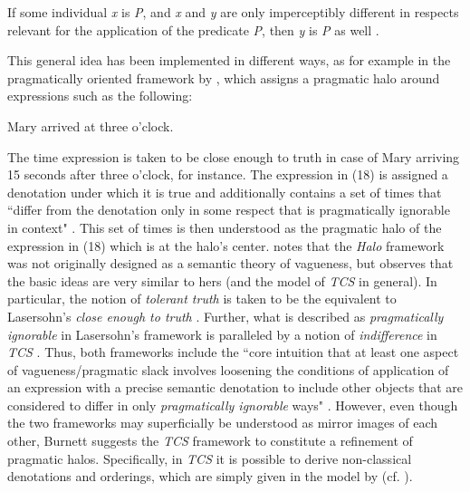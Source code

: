\documentclass[output=paper
,modfonts
,nonflat]{langsci/langscibook}
\begin{document}
\ea
	If some individual \textit{x} is \textit{P}, and \textit{x} and \textit{y} are only imperceptibly different in respects relevant for the application of the predicate \textit{P}, then \textit{y} is \textit{P} as well \textcite[348]{Cobreros2012}.
\z

This general idea has been implemented in different ways, as for example in the pragmatically oriented framework by \citet{Lasersohn1999}, which assigns a pragmatic halo around expressions such as the following:

\ea
	Mary arrived at three o'clock.
\z

The time expression is taken to be close enough to truth in case of Mary arriving 15 seconds after three o'clock, for instance. The expression in (18) is assigned a denotation under which it is true and additionally contains a set of times that ``differ from the denotation only in some respect that is pragmatically ignorable in context" \textcite[526]{Lasersohn1999}. This set of times is then understood as the pragmatic halo of the expression in (18) which is at the halo's center. \textcite[29]{Burnett2017} notes that the \textit{Halo} framework was not originally designed as a semantic theory of vagueness, but observes that the basic ideas are very similar to hers (and the model of \textit{TCS} in general). In particular, the notion of \textit{tolerant truth} is taken to be the equivalent to Lasersohn's \textit{close enough to truth} \textcite[32]{Burnett2017}. Further, what is described as \textit{pragmatically ignorable} in Lasersohn's framework is paralleled by a notion of \textit{indifference} in \textit{TCS} \textcite[32]{Burnett2017}. Thus, both frameworks include the ``core intuition that at least one aspect of vagueness/pragmatic slack involves loosening the conditions of application of an expression with a precise semantic denotation to include other objects that are considered to differ in only \textit {pragmatically ignorable} ways" \textcite[32--33]{Burnett2017}. However, even though the two frameworks may superficially be understood as mirror images of each other, Burnett suggests the \textit{TCS} framework to constitute a refinement of pragmatic halos. Specifically, in \textit{TCS} it is possible to derive non-classical denotations and orderings, which are simply given in the model by \citet{Lasersohn1999} (cf. \citet[33]{Burnett2017}).
\end{document}

